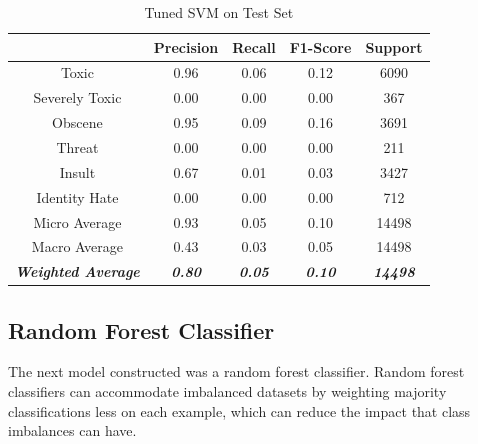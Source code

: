 \documentclass{article}
\begin{document}
{{	  \begin{table}[h!]
		  \centering
		  \begin{tabular}{|c|| c c c c|}
			  \hline
			                                     & Precision              & Recall                 & F1-Score               & Support                 \\ [0.5ex]
			  \hline\hline
			  Toxic                              & 0.96                   & 0.06                   & 0.12                   & 6090                    \\
			  Severely Toxic                     & 0.00                   & 0.00                   & 0.00                   & 367                     \\
			  Obscene                            & 0.95                   & 0.09                   & 0.16                   & 3691                    \\
			  Threat                             & 0.00                   & 0.00                   & 0.00                   & 211                     \\
			  Insult                             & 0.67                   & 0.01                   & 0.03                   & 3427                    \\
			  Identity Hate                      & 0.00                   & 0.00                   & 0.00                   & 712                     \\
			  \hline\hline
			  Micro Average                      & 0.93                   & 0.05                   & 0.10                   & 14498                   \\
			  Macro Average                      & 0.43                   & 0.03                   & 0.05                   & 14498                   \\
			  \textit{\textbf{Weighted Average}} & \textit{\textbf{0.80}} & \textit{\textbf{0.05}} & \textit{\textbf{0.10}} & \textit{\textbf{14498}} \\

			  \hline
		  \end{tabular}
		  \caption{Tuned SVM on Test Set}
		  \label{table:svm-test}
	  \end{table}
  }
  \subsection{Random Forest Classifier}{
	  The next model constructed was a random forest classifier. Random forest
	  classifiers can accommodate imbalanced datasets by weighting majority
	  classifications less on each example, which can reduce the impact that class
	  imbalances can have.

}}
\end{document}
